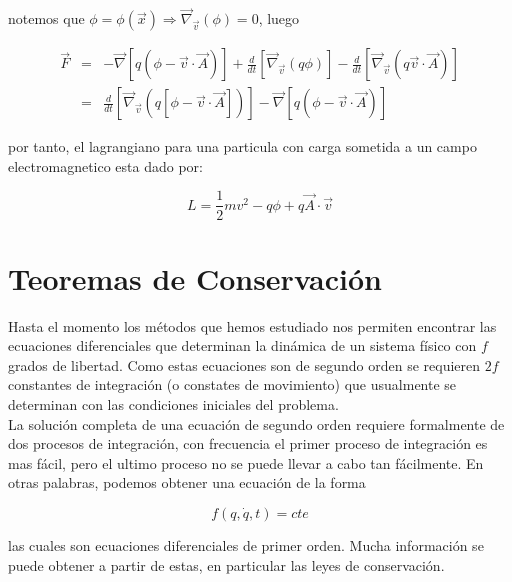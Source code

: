 \documentclass[12pt]{report}
\begin{document}
notemos que $\phi=\phi(\vec{x}) \Rightarrow \vec{\nabla}_{\vec{v}}\left(\phi\right)=0$, luego

\begin{eqnarray}
\vec{F}&=&-\vec{\nabla} \left[ q\left( \phi - \vec{v} \cdot \vec{A}  \right) \right] +\frac{d}{dt} \left[\vec{\nabla}_{\vec{v}}\left( q\phi \right) \right] - \frac{d}{dt} \left[ \vec{\nabla}_{\vec{v}} \left( q\vec{v} \cdot \vec{A} \right) \right] \\
&=& \frac{d}{dt}\left[ \vec{\nabla}_{\vec{v}} \left( q \left[ \phi - \vec{v} \cdot \vec{A} \right] \right) \right] - \vec{\nabla} \left[ q \left( \phi - \vec{v} \cdot \vec{A} \right) \right]
\end{eqnarray}

por tanto, el lagrangiano para una particula con carga sometida a un campo electromagnetico esta dado por:

\begin{equation}
L=\frac{1}{2}mv^2 - q\phi + q\vec{A} \cdot \vec{v}
\end{equation}













\section{Teoremas de Conservación}

Hasta el momento los métodos que hemos estudiado nos permiten encontrar las ecuaciones diferenciales que determinan la dinámica de un sistema físico con $f$ grados de libertad. Como estas ecuaciones son de segundo orden se requieren $2f$ constantes de integración (o constates de movimiento) que usualmente se determinan con las condiciones iniciales del problema. \\


La solución completa de una ecuación de segundo orden requiere formalmente de dos procesos de integración, con frecuencia el primer proceso de integración es mas fácil, pero el ultimo proceso no se puede llevar a cabo tan fácilmente. En otras palabras, podemos obtener una ecuación de la forma

\begin{equation}
f(q,\dot{q},t) = cte
\end{equation}

las cuales son ecuaciones diferenciales de primer orden. Mucha información se puede obtener a partir de estas, en particular las leyes de conservación.\\
\end{document}
